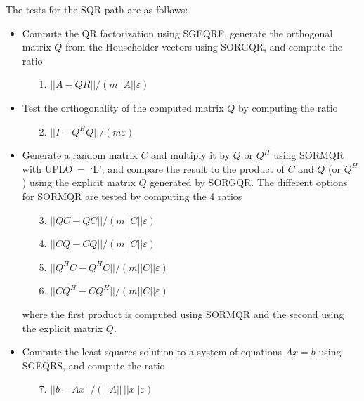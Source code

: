 \noindent
The tests for the SQR path are as follows:
\begin{itemize}

\item
Compute the QR factorization using SGEQRF, generate the orthogonal
matrix $Q$ from the Householder vectors using SORGQR,
and compute the ratio
\begin{itemize}
\item[1.] $|| A - Q R || / ( m || A || \varepsilon ) $
\end{itemize}

\item
Test the orthogonality of the computed matrix $Q$ by computing the ratio
\begin{itemize}
\item[2.] $ || I - Q^H Q || / ( m \varepsilon )$
\end{itemize}

\item
Generate a random matrix $C$ and multiply it by $Q$ or $Q^H$
using SORMQR with UPLO~=~`L', and compare the result to
the product of $C$ and $Q$ (or $Q^H$) using the explicit
matrix $Q$ generated by SORGQR.  The different options for
SORMQR are tested by computing the 4 ratios
\begin{itemize}
\item[3.] $ || Q C - Q C || / ( m || C || \varepsilon ) $
\item[4.] $ || C Q - C Q || / ( m || C || \varepsilon ) $
\item[5.] $ || Q^H C - Q^H C || / ( m || C || \varepsilon ) $
\item[6.] $ || C Q^H - C Q^H || / ( m || C || \varepsilon ) $
\end{itemize}
where the first product is computed using SORMQR and the second
using the explicit matrix $Q$.

\item
Compute the least-squares solution to a system of equations
$A x = b$ using SGEQRS, and compute the ratio
\begin{itemize}
\item[7.] $|| b - A x || / ( || A || \, || x || \varepsilon )$
\end{itemize}

\end{itemize}


